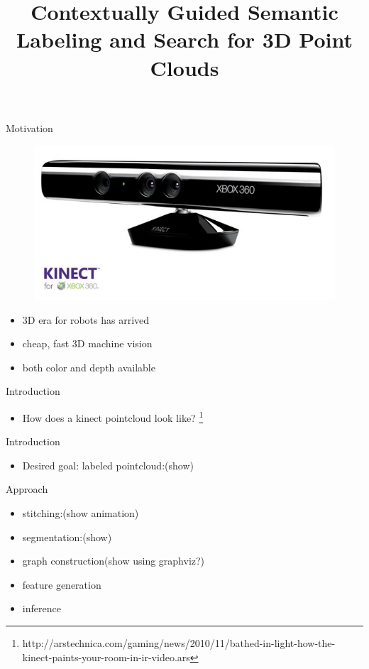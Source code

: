 \documentclass{beamer}
\title{Contextually Guided Semantic Labeling and Search for 3D Point Clouds}
\begin{document}
\begin{frame}
\titlepage
\end{frame}

\begin{frame}{Motivation}
	\begin{figure}[t!]
		\includegraphics[width=.5\linewidth]{kinect.jpg}
	\end{figure}

	\begin{itemize}
		\item 3D era for robots has arrived 
		\item  cheap, fast 3D machine vision
		\item  both color and depth available
	\end{itemize}

\end{frame}

\begin{frame}{Introduction}
	\begin{itemize}
		\item How does a kinect pointcloud look like? \footnote{http://arstechnica.com/gaming/news/2010/11/bathed-in-light-how-the-kinect-paints-your-room-in-ir-video.ars}

	\end{itemize}
\end{frame}

\begin{frame}{Introduction}
	\begin{itemize}
		\item Desired goal: labeled pointcloud:(show)

	\end{itemize}
\end{frame}

\begin{frame}{Approach}
	\begin{itemize}
		\item stitching:(show animation)
		\item  segmentation:(show)
		\item  graph construction(show using graphviz?)
		\item  feature generation
		\item  inference
	\end{itemize}

\end{frame}
\end{document}
